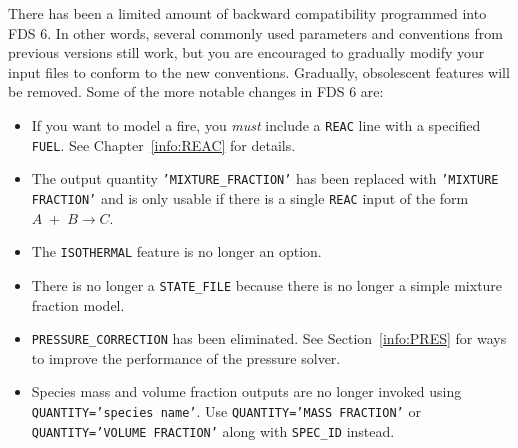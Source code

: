 \documentclass[11pt]{book}
\newcommand{\ct}{\tt\small}
\begin{document}
There has been a limited amount of backward compatibility programmed into FDS 6. In other words, several commonly used parameters and conventions from previous versions still
work, but you are encouraged to gradually modify your input files to conform to the new conventions. Gradually, obsolescent features will be removed. Some of the more notable changes
in FDS 6 are:
\begin{itemize}
\item If you want to model a fire, you {\em must} include a {\ct REAC} line with a specified {\ct FUEL}. See Chapter~\ref{info:REAC} for details.
\item The output quantity {\ct 'MIXTURE\_FRACTION'} has been replaced with {\ct 'MIXTURE FRACTION'} and is only usable if there is a single {\ct REAC} input of the form $A \; + \; B \rightarrow C$.
\item The {\ct ISOTHERMAL} feature is no longer an option.
\item There is no longer a {\ct STATE\_FILE} because there is no longer a simple mixture fraction model.
\item {\ct PRESSURE\_CORRECTION} has been eliminated. See Section~\ref{info:PRES} for ways to improve the performance of the pressure solver.
\item Species mass and volume fraction outputs are no longer invoked using {\ct QUANTITY='species name'}. Use {\ct QUANTITY='MASS FRACTION'} or {\ct QUANTITY='VOLUME FRACTION'} along with
{\ct SPEC\_ID} instead.
\end{itemize}
\end{document}
